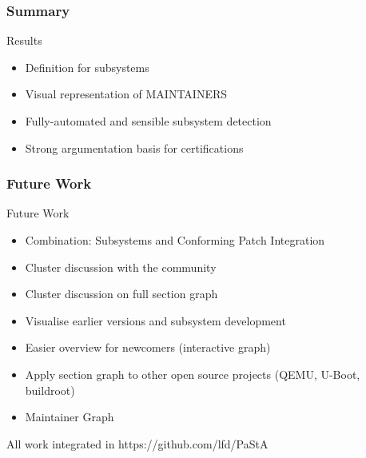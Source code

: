 \documentclass[12pt]{beamer}
\begin{document}
	\begin{frame}
	\frametitle{Summary}
		\begin{block}{Results}
			\begin{itemize}
				\item Definition for subsystems
				\item Visual representation of MAINTAINERS
				\item Fully-automated and sensible subsystem detection
				\item Strong argumentation basis for certifications
			\end{itemize}
		\end{block}
	\end{frame}

	\begin{frame}
	\frametitle{Future Work}
		\begin{block}{Future Work}
			\begin{itemize}
				\item Combination: Subsystems and Conforming Patch Integration
				\item Cluster discussion with the community
				\item Cluster discussion on full section graph
				\item Visualise earlier versions and subsystem development
				\item Easier overview for newcomers (interactive graph)
				\item Apply section graph to other open source projects (QEMU, U-Boot, buildroot)
				\item Maintainer Graph
			\end{itemize}
		\end{block}

		All work integrated in https://github.com/lfd/PaStA
	\end{frame}
\end{document}
